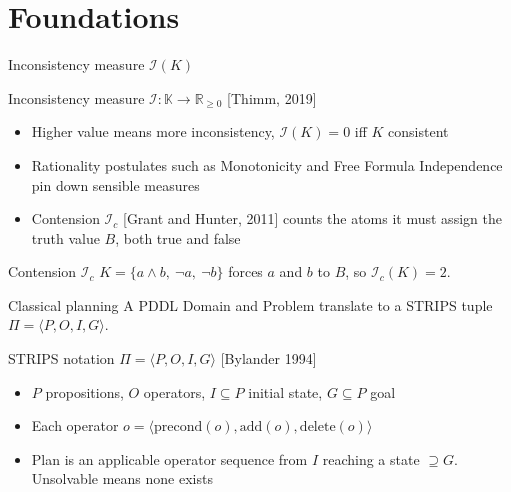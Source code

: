 \section{Foundations}

\begin{frame}{Inconsistency measure $\mathcal{I}(K)$}
    \begin{block}{Inconsistency measure $\mathcal{I} : \mathbb{K} \to \mathbb{R}_{\geq 0}$ [Thimm, 2019]}
        \begin{itemize}
            \item Higher value means more inconsistency, $\mathcal{I}(K) = 0$ iff $K$ consistent
            \item Rationality postulates such as Monotonicity and Free Formula Independence pin down sensible measures
            \item Contension $\mathcal{I}_c$ [Grant and Hunter, 2011] counts the atoms it must assign the truth value $B$, both true and false
        \end{itemize}
    \end{block}

    \begin{exampleblock}{Contension $\mathcal{I}_c$}
        $K = \{a \land b,\ \neg a,\ \neg b\}$ forces $a$ and $b$ to $B$, so $\mathcal{I}_c(K) = 2$.
    \end{exampleblock}
\end{frame}

\begin{frame}{Classical planning}
    A PDDL Domain and Problem translate to a STRIPS tuple $\Pi = \langle P, O, I, G \rangle$.

    \begin{block}{STRIPS notation $\Pi = \langle P, O, I, G \rangle$ [Bylander 1994]}
        \begin{itemize}
            \item $P$ propositions, $O$ operators, $I \subseteq P$ initial state, $G \subseteq P$ goal
            \item Each operator $o = \langle \text{precond}(o), \text{add}(o), \text{delete}(o) \rangle$
            \item Plan is an applicable operator sequence from $I$ reaching a state $\supseteq G$. Unsolvable means none exists
        \end{itemize}
    \end{block}

\end{frame}
